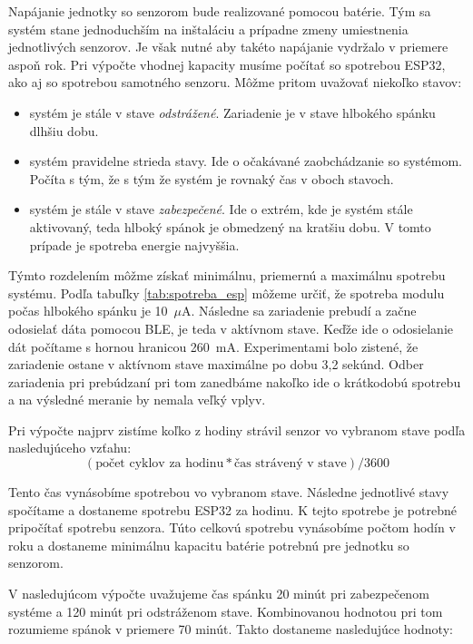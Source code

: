 Napájanie jednotky so senzorom bude realizované pomocou batérie. Tým sa systém stane jednoduchším na inštaláciu a prípadne zmeny umiestnenia jednotlivých senzorov. Je však nutné aby takéto napájanie vydržalo v priemere aspoň rok. Pri výpočte vhodnej kapacity musíme počítať so spotrebou ESP32, ako aj so spotrebou samotného senzoru. Môžme pritom uvažovať niekoľko stavov:
\begin{itemize}
    \item systém je stále v stave \textit{odstrážené}. Zariadenie je v stave hlbokého spánku dlhšiu dobu.
    \item systém pravidelne strieda stavy. Ide o očakávané zaobchádzanie so systémom. Počíta s tým, že s tým že systém je rovnaký čas v oboch stavoch.
    \item systém je stále v stave \textit{zabezpečené}. Ide o extrém, kde je systém stále aktivovaný, teda hlboký spánok je obmedzený na kratšiu dobu. V tomto prípade je spotreba energie najvyššia.
\end{itemize}

Týmto rozdelením môžme získať minimálnu, priemernú a maximálnu spotrebu systému. Podľa tabuľky \ref{tab:spotreba_esp} môžeme určiť, že spotreba modulu počas hlbokého spánku je 10~$\mu$A. Následne sa zariadenie prebudí a začne odosielať dáta pomocou BLE, je teda v aktívnom stave. Keďže ide o odosielanie dát počítame s hornou hranicou 260~mA. Experimentami bolo zistené, že zariadenie ostane v aktívnom stave maximálne po dobu 3,2 sekúnd. Odber zariadenia pri prebúdzaní pri tom zanedbáme nakoľko ide o krátkodobú spotrebu a na výsledné meranie by nemala veľký vplyv.

Pri výpočte najprv zistíme koľko z hodiny strávil senzor vo vybranom stave podľa nasledujúceho vzťahu:
$$(\text{počet cyklov za hodinu} * \text{čas strávený v stave}) / 3600$$

Tento čas vynásobíme spotrebou vo vybranom stave. Následne jednotlivé stavy spočítame a dostaneme spotrebu ESP32 za hodinu. K tejto spotrebe je potrebné pripočítať spotrebu senzora. Túto celkovú spotrebu vynásobíme počtom hodín v roku a dostaneme minimálnu kapacitu batérie potrebnú pre jednotku so senzorom.

V nasledujúcom výpočte uvažujeme čas spánku 20 minút pri zabezpečenom systéme a 120 minút pri odstráženom stave. Kombinovanou hodnotou pri tom rozumieme spánok v priemere 70 minút. Takto dostaneme nasledujúce hodnoty:

